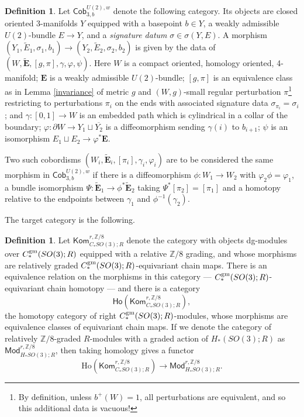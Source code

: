 \documentclass{memo-l}
\theoremstyle{definition}
\newtheorem{definition}[theorem]{Definition}
\theoremstyle{remark}
\numberwithin{section}{chapter}
\numberwithin{equation}{chapter}
\begin{document}
\begin{definition}
Let $\mathsf{Cob}_{3,b}^{U(2),w}$ denote the following category. Its objects are closed oriented 3-manifolds $Y$ equipped with a basepoint $b \in Y$, a weakly admissible $U(2)$-bundle $E \to Y$, and a \emph{signature datum} $\sigma \in \sigma(Y,E)$. A morphism $(Y_1, \tilde E_1, \sigma_1, b_1) \to (Y_2, \tilde E_2, \sigma_2, b_2)$ is given by the data of $(W, \widetilde{\mathbf{E}}, [g,\pi],\gamma, \varphi,\psi)$. Here $W$ is a compact oriented, homology oriented, 4-manifold; $\mathbf{E}$ is a weakly admissible $U(2)$-bundle; $[g,\pi]$ is an equivalence class as in Lemma \ref{invariance} of metric $g$ and $(W,g)$-small regular perturbation $\pi$\footnote{By definition, unless $b^+(W) = 1$, all perturbations are equivalent, and so this additional data is vacuous!} restricting to perturbations $\pi_i$ on the ends with associated signature data $\sigma_{\pi_i} = \sigma_i$; and $\gamma: [0,1] \to W$ is an embedded path which is cylindrical in a collar of the boundary; $\varphi: \partial W \to Y_1 \sqcup \overline{Y_2}$ is a diffeomorphism sending $\gamma(i)$ to $b_{i+1}$; $\psi$ is an isomorphism $E_1 \sqcup E_2 \to \varphi^*\mathbf{E}$.

Two such cobordisms $(W_i, \widetilde{\mathbf{E}}_i, [\pi_i], \gamma_i, \varphi_i)$ are to be considered the same morphism in $\mathsf{Cob}_{3,b}^{U(2),w}$ if there is a diffeomorphism $\phi: W_1 \to W_2$ with $\varphi_2 \phi = \varphi_1$, a bundle isomorphism $\Psi: \widetilde{\mathbf{E}}_1 \to \phi^*\widetilde{\mathbf{E}}_2$ taking $\Psi^*[\pi_2] = [\pi_1]$ and a homotopy relative to the endpoints between $\gamma_1$ and $\phi^{-1}(\gamma_2)$.
\end{definition}
\noindent
The target category is the following.

\begin{definition}Let $\mathsf{Kom}_{C_*SO(3);R}^{r,\mathbb Z/8}$ denote the category with objects dg-modules over $C_*^{\textup{gm}}(SO(3);R)$ equipped with a relative $\mathbb Z/8$ grading, and whose morphisms are relatively graded $C_*^{\textup{gm}}(SO(3);R)$-equivariant chain maps. There is an equivalence relation on the morphisms in this category --- $C_*^{\textup{gm}}(SO(3);R)$-equivariant chain homotopy --- and there is a category $$\mathsf{Ho}\left(\mathsf{Kom}_{C_*SO(3);R}^{r,\mathbb Z/8}\right),$$ the homotopy category of right $C_*^{\textup{gm}}(SO(3);R)$-modules, whose morphisms are equivalence classes of equivariant chain maps. If we denote the category of relatively $\mathbb Z/8$-graded $R$-modules with a graded action of $H_*(SO(3);R)$ as $\mathsf{Mod}^{r,\mathbb Z/8}_{H_*SO(3);R}$, then taking homology gives a functor $$\mathrm{Ho}\left(\mathsf{Kom}_{C_*SO(3);R}^{r,\mathbb Z/8}\right) \to \mathsf{Mod}^{r,\mathbb Z/8}_{H_*SO(3);R}.$$
\end{definition}
\end{document}
